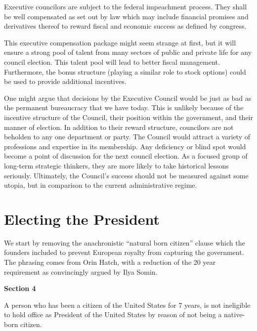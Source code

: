 \documentclass{article}
\newcommand{\quotes}[1]{``#1''}
\begin{document}
\begin{quoting}
Executive councilors are subject to the federal impeachment process. They shall be well compensated as set out by law which may include financial promises and derivatives thereof to reward fiscal and economic success as defined by congress.
\end{quoting}

This executive compensation package might seem strange at first, but it will ensure a strong pool of talent from many sectors of public and private life for any council election. This talent pool will lead to better fiscal management\cite{Sowell}. Furthermore, the bonus structure (playing a similar role to stock options) could be used to provide additional incentives.

One might argue that decisions by the Executive Council would be just as bad as the permanent bureaucracy that we have today. This is unlikely because of the incentive structure of the Council, their position within the government, and their manner of election. In addition to their reward structure, councilors are not beholden to any one department or party. The Council would attract a variety of professions and expertise in its membership. Any deficiency or blind spot would become a point of discussion for the next council election. As a focused group of long-term strategic thinkers, they are more likely to take historical lessons seriously. Ultimately, the Council's success should not be measured against some utopia, but in comparison to the current administrative regime.

\section{Electing the President}

We start by removing the anachronistic \quotes{natural born citizen} clause which the founders included to prevent European royalty from capturing the government. The phrasing comes from Orin Hatch\cite{Somin_Hatch}, with a reduction of the 20 year requirement as convincingly argued by Ilya Somin\cite{Somin_NBC}.

\begin{quoting}
\textbf{Section 4}

A person who has been a citizen of the United States for 7 years, is not ineligible to hold office as President of the United States by reason of not being a native-born citizen.
\end{quoting}
\end{document}
